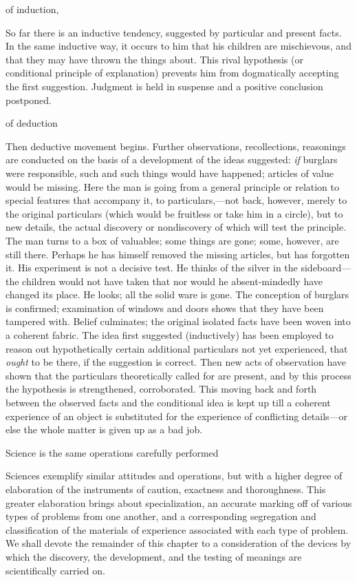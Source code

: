 \documentclass[letterpaper]{book}
\begin{document}
of induction,

So far there is an inductive tendency, suggested by particular and
present facts. In the same inductive way, it occurs to him that his
children are mischievous, and that they may have thrown the things
about. This rival hypothesis (or conditional principle of explanation)
prevents him from dogmatically accepting the first suggestion. Judgment
is held in suspense and a positive conclusion
postponed.

of deduction

Then deductive movement begins. Further observations, recollections,
reasonings are conducted on the basis of a development of the ideas
suggested: \emph{if} burglars were responsible, such and such things
would have happened; articles of value would be missing. Here the man is
going from a general principle or relation to special features that
accompany it, to particulars,---not back, however, merely to the
original particulars (which would be fruitless or take him in a circle),
but to new details, the actual discovery or nondiscovery of which will
test the principle. The man turns to a box of valuables; some things are
gone; some, however, are still there. Perhaps he has himself removed the
missing articles, but has forgotten it. His experiment is not a decisive
test. He thinks of the silver in the sideboard---the children would not
have taken that nor would he absent-mindedly have changed its place. He
looks; all the solid ware is gone. The conception of burglars is
confirmed; examination of windows and doors shows that they have been
tampered with. Belief culminates; the original isolated facts have been
woven into a coherent fabric. The idea first suggested (inductively) has
been employed to reason out hypothetically certain additional
particulars not yet experienced, that \emph{ought} to be there, if the
suggestion is correct. Then new acts of observation have shown that the
particulars theoretically called for are present, and by this process
the hypothesis is strengthened, corroborated. This moving back and forth
between the observed facts and the conditional idea is kept up till a
coherent experience of an object is substituted for the experience of
conflicting details---or else the whole matter is given up as a bad job.

Science is the same operations carefully performed

Sciences exemplify similar attitudes and
operations,
but with a higher degree of elaboration of the instruments of caution,
exactness and thoroughness. This greater elaboration brings about
specialization, an accurate marking off of various types of problems
from one another, and a corresponding segregation and classification of
the materials of experience associated with each type of problem. We
shall devote the remainder of this chapter to a consideration of the
devices by which the discovery, the development, and the testing of
meanings are scientifically carried on.
\end{document}

